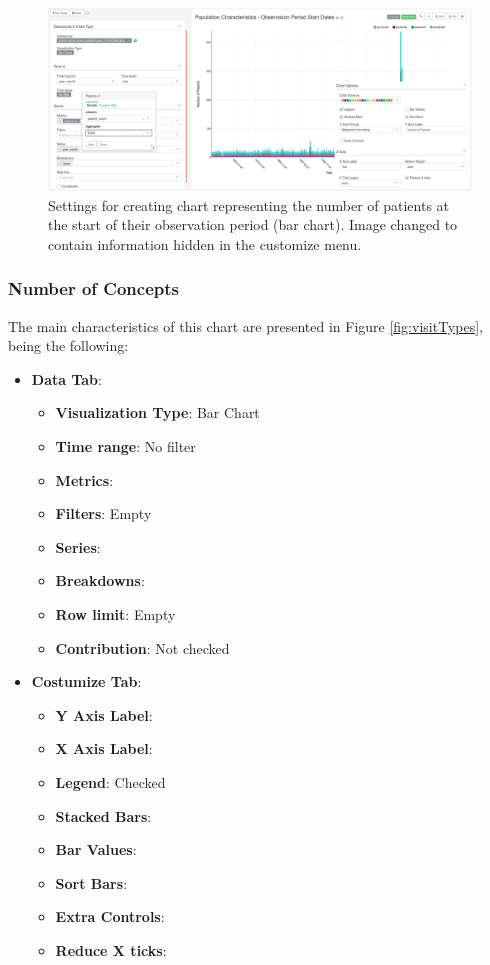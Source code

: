 \documentclass[]{book}
\providecommand{\tightlist}{%
  \setlength{\itemsep}{0pt}\setlength{\parskip}{0pt}}
\begin{document}
\begin{figure}
\includegraphics[width=1\linewidth]{images/populationCharacteristicsObservationPeriodStartDates} \caption{Settings for creating chart representing the number of patients at the start of their observation period (bar chart). Image changed to contain information hidden in the customize menu.}\label{fig:visitTypes7}
\end{figure}

\subsubsection{Number of Concepts}\label{number-of-concepts}

The main characteristics of this chart are presented in Figure
\ref{fig:visitTypes}, being the following:

\begin{itemize}
\tightlist
\item
  \textbf{Data Tab}:

  \begin{itemize}
  \tightlist
  \item
    \textbf{Visualization Type}: Bar Chart
  \item
    \textbf{Time range}: No filter
  \item
    \textbf{Metrics}:
  \item
    \textbf{Filters}: Empty
  \item
    \textbf{Series}:
  \item
    \textbf{Breakdowns}:
  \item
    \textbf{Row limit}: Empty
  \item
    \textbf{Contribution}: Not checked
  \end{itemize}
\item
  \textbf{Costumize Tab}:

  \begin{itemize}
  \tightlist
  \item
    \textbf{Y Axis Label}:
  \item
    \textbf{X Axis Label}:
  \item
    \textbf{Legend}: Checked
  \item
    \textbf{Stacked Bars}:
  \item
    \textbf{Bar Values}:
  \item
    \textbf{Sort Bars}:
  \item
    \textbf{Extra Controls}:
  \item
    \textbf{Reduce X ticks}:
  \end{itemize}
\end{itemize}
\end{document}
